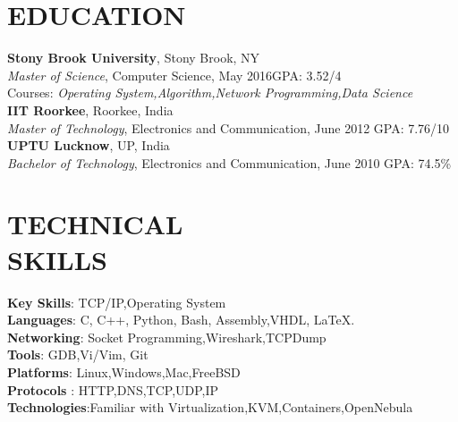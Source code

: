 \documentclass[margin]{res}
\begin{document}
\begin{resume}

\section{EDUCATION}
\textbf{Stony Brook University}, Stony Brook, NY\\
{\sl Master of Science}, Computer Science, May 2016\hfill GPA: 
3.52/4 \\
Courses: \textit{Operating System,Algorithm,Network Programming,Data Science}
\\
\textbf{IIT Roorkee}, Roorkee, India\\ 
{\sl Master of Technology}, Electronics and Communication, June 2012\hfill 
GPA: 7.76/10 \\
\textbf{UPTU Lucknow}, UP, India\\ 
{\sl Bachelor of Technology}, Electronics and Communication, June 2010\hfill 
GPA:  74.5\%
\section{TECHNICAL\\SKILLS}
\textbf{Key Skills}: TCP/IP,Operating System
\\
\textbf{Languages}: C, C++, Python, Bash, Assembly,VHDL, \LaTeX.
\\
\textbf{Networking}: Socket Programming,Wireshark,TCPDump
\\
\textbf{Tools}: GDB,Vi/Vim, Git
\\
\textbf{Platforms}: Linux,Windows,Mac,FreeBSD
\\
\textbf{Protocols} : HTTP,DNS,TCP,UDP,IP
\\
\textbf{Technologies}:Familiar with Virtualization,KVM,Containers,OpenNebula



\end{resume}
\end{document}
